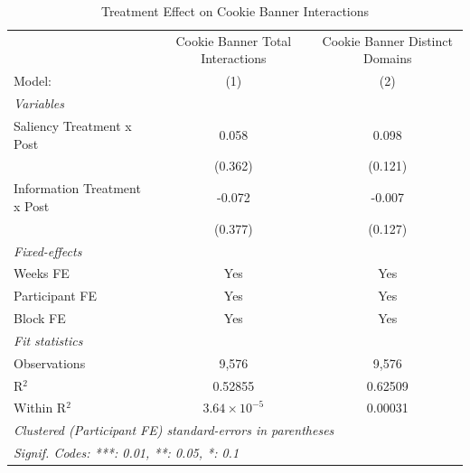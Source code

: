 
\begin{table}[htbp]
   \caption{Treatment Effect on Cookie Banner Interactions}
   \centering
   \begin{tabular}{lcc}
      \tabularnewline \midrule \midrule
                                   & Cookie Banner Total Interactions & Cookie Banner Distinct Domains \\   
      Model:                       & (1)                              & (2)\\  
      \midrule
      \emph{Variables}\\
      Saliency Treatment x Post    & 0.058                            & 0.098\\   
                                   & (0.362)                          & (0.121)\\   
      Information Treatment x Post & -0.072                           & -0.007\\   
                                   & (0.377)                          & (0.127)\\   
      \midrule
      \emph{Fixed-effects}\\
      Weeks FE                     & Yes                              & Yes\\  
      Participant FE               & Yes                              & Yes\\  
      Block FE                     & Yes                              & Yes\\  
      \midrule
      \emph{Fit statistics}\\
      Observations                 & 9,576                            & 9,576\\  
      R$^2$                        & 0.52855                          & 0.62509\\  
      Within R$^2$                 & $3.64\times 10^{-5}$             & 0.00031\\  
      \midrule \midrule
      \multicolumn{3}{l}{\emph{Clustered (Participant FE) standard-errors in parentheses}}\\
      \multicolumn{3}{l}{\emph{Signif. Codes: ***: 0.01, **: 0.05, *: 0.1}}\\
   \end{tabular}
\end{table}


